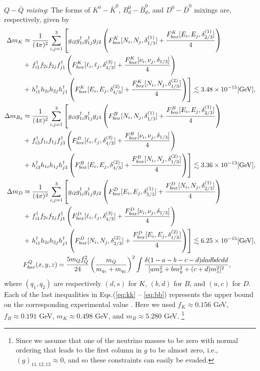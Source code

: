 \documentclass[%
showkeys,12pt,
preprint,preprintnumbers,nofootinbib,
groupedaddress,superscriptaddress,amsmath,amssymb]{revtex4}
\newcommand{\nn}{\nonumber}
\numberwithin{equation}{section}
\begin{document}
 {\it $Q-\bar Q$ mixing}:   
The forms of $K^0-\bar K^0$, $B_d^0-\bar B_d^0$, and $D^0-\bar D^0$ mixings are, respectively, given by
{\begin{align}
\Delta m_K&\approx
\frac{1}{(4\pi)^2}
\sum_{i,j=1}^3
\left[g_{i2} g^\dag_{1i}g^\dag_{1j} g_{j2} \left(F^K_{box}[N_i,N_j,\delta_{1/3}^{(1)}]+\frac{F^K_{box}[E_i,E_j,\delta_{2/3}^{(1)}]}4\right)\right.
\nn\\&+
\left.f_{i1}^\dag f_{2i}f_{2j} f^\dag_{j1}\left(F^K_{box}[\ell_i,\ell_j,\delta_{4/3}^{(3)}]+\frac{F^K_{box}[\nu_i,\nu_j,\delta_{1/3}]}4\right)
\right.
\nn\\&+
\left.
h_{i1}^\dag h_{2i}h_{2j} h^\dag_{j1}\left(F^K_{box}[E_i,E_j,\delta_{4/3}^{(2)}]+\frac{F^K_{box}[N_i,N_j,\delta_{1/3}^{(2)}]}4\right) \right]
\lesssim 3.48\times10^{-15}[{\rm GeV}],\label{eq:kk}\\
\Delta m_{B_d}&\approx
\frac{1}{(4\pi)^2}
\sum_{i,j=1}^3
\left[g_{i3} g^\dag_{1i}g^\dag_{1j} g_{j3} \left(F^B_{box}[N_i,N_j,\delta_{1/3}^{(1)}]+\frac{F^B_{box}[E_i,E_j,\delta_{2/3}^{(1)}]}4\right)\right.
\nn\\&+
\left.f_{i3}^\dag f_{1i}f_{1j} f^\dag_{j3}\left(F^B_{box}[\ell_i,\ell_j,\delta_{4/3}^{(3)}]+\frac{F^B_{box}[\nu_i,\nu_j,\delta_{1/3}]}4\right)
\right.
\nn\\&+
\left.
h_{i3}^\dag h_{1i}h_{1j} h^\dag_{j3}\left(F^B_{box}[E_i,E_j,\delta_{4/3}^{(2)}]+\frac{F^B_{box}[N_i,N_j,\delta_{1/3}^{(2)}]}4\right) \right]
 \lesssim 3.36\times10^{-13} [{\rm GeV}], \\
\Delta m_D&\approx
\frac{1}{(4\pi)^2}
\sum_{i,j=1}^3
\left[g_{i2} g^\dag_{1i}g^\dag_{1j} g_{j2} \left(F^D_{box}[E_i,E_j,\delta_{5/3}^{(1)}]+\frac{F^D_{box}[N_i,N_j,\delta_{2/3}^{(1)}]}4\right)\right.
\nn\\&+
\left.f_{i1}^\dag f_{2i}f_{2j} f^\dag_{j1}\left(F^D_{box}[\ell_i,\ell_j,\delta_{4/3}^{(3)}]+\frac{F^D_{box}[\nu_i,\nu_j,\delta_{1/3}]}4\right)
\right.
\nn\\&+
\left.
h_{i1}^\dag h_{2i}h_{2j} h^\dag_{j1}\left(F^D_{box}[N_i,N_j,\delta_{2/3}^{(2)}]+\frac{F^D_{box}[E_i,E_j,\delta_{1/3}^{(2)}]}4\right) \right]
 \lesssim 6.25\times10^{-15}[{\rm GeV}],\label{eq:bb}\\
&F^Q_{box}(x,y,z)
=
\frac{5 m_Q f_Q^2}{24}\left(\frac{m_Q}{m_{q_1}+m_{q_2}}\right)^2
\int \frac{\delta(1-a-b-c-d)dadbdcdd}{[a m_x^2+b m_y^2+(c+d) m_z^2]^2},
\end{align}
where $(q_1,q_2)$ are respectively $(d,s)$ for $K$,  $(b,d)$ for $B$, and  $(u,c)$ for $D$. Each of the last inequalities in Eqs.(\ref{eq:kk} -- \ref{eq:bb})
represents the upper bound on the corresponding experimental 
value \cite{pdg}.  Here we used
$f_K\approx0.156$ GeV, $f_B\approx0.191$ GeV, $m_K\approx0.498$ GeV,
and $m_B\approx5.280$ GeV.
\footnote{Since we assume that one of the neutrino masses to be zero with
normal ordering that leads to the 
{first column in $g$ to be almost zero, i.e.,
$(g)_{11,12,13}\approx 0$,} and so these constraints can easily be evaded. }
}
\end{document}
